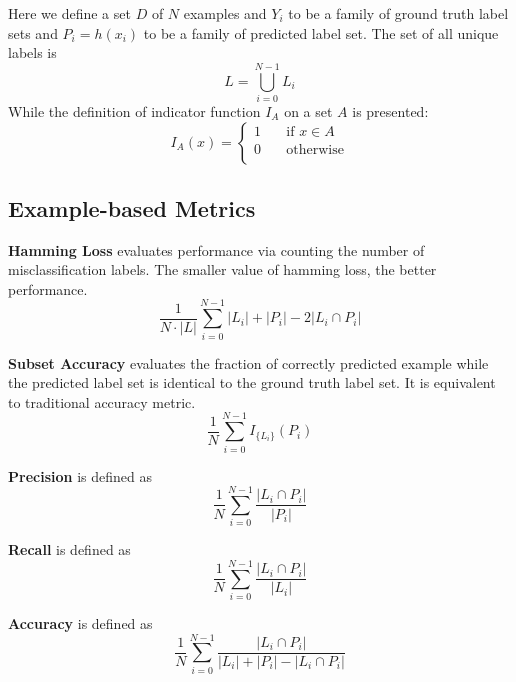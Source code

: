 Here we define a set $D$ of $N$ examples and $Y_{i}$ to be a family of ground truth label sets and $P_{i} = h(x_{i})$ to be a family of predicted label set. The set of all unique labels is
\begin{equation}\label{eq:UniLabel}
L = \bigcup_{i=0}^{N-1} L_{i}
\end{equation}
While the definition of indicator function $I_{A}$ on a set $A$ is presented:
\begin{equation}\label{eq:IndicatorFunc}
I_{A}(x) =
  \begin{cases}
    1       & \quad \text{if } x \in A\\
    0  & \quad \text{otherwise}\\
  \end{cases}
\end{equation}

\subsection{Example-based Metrics}

\textbf{Hamming Loss} evaluates performance via counting the number of misclassification labels. The smaller value of hamming loss, the better performance.
\begin{equation}\label{eq:HammingLoss}
\frac{1}{N \cdot \left|L\right|} \sum_{i=0}^{N - 1} \left|L_i\right| + \left|P_i\right| - 2\left|L_i
          \cap P_i\right|
\end{equation}

\textbf{Subset Accuracy} evaluates the fraction of correctly predicted example while the predicted label set is identical to the ground truth label set. It is equivalent to traditional accuracy metric.
\begin{equation}\label{eq:SubsetAcu}
\frac{1}{N} \sum_{i=0}^{N-1} I_{\{L_i\}}(P_i)
\end{equation}

\textbf{Precision} is defined as
\begin{equation}\label{eq:Precision}
\frac{1}{N} \sum_{i=0}^{N-1} \frac{\left|L_i \cap P_i\right|}{\left|P_i\right|}
\end{equation}

\textbf{Recall} is defined as
\begin{equation}\label{eq:Recall}
\frac{1}{N} \sum_{i=0}^{N-1} \frac{\left|L_i \cap P_i\right|}{\left|L_i\right|}
\end{equation}

\textbf{Accuracy} is defined as
\begin{equation}\label{eq:Accuracy}
\frac{1}{N} \sum_{i=0}^{N - 1} \frac{\left|L_i \cap P_i \right|}
        {\left|L_i\right| + \left|P_i\right| - \left|L_i \cap P_i \right|}
\end{equation}

